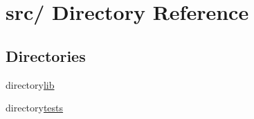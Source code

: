\hypertarget{dir_000002}{
\section{src/ Directory Reference}
\label{dir_000002}
}
\subsection*{Directories}
\begin{CompactItemize}
\item 
directory\hyperlink{dir_000003}{lib}
\item 
directory\hyperlink{dir_000004}{tests}
\end{CompactItemize}
